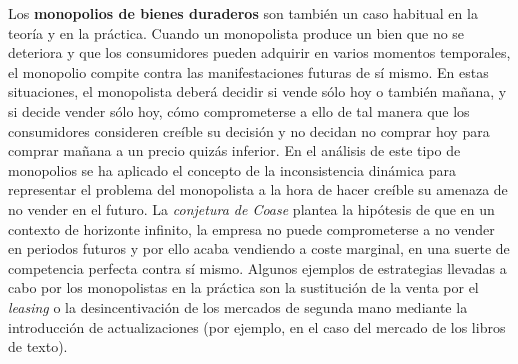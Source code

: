 \documentclass{nuevotema}
\begin{document}
Los \textbf{monopolios de bienes duraderos} son también un caso habitual en la teoría y en la práctica. Cuando un monopolista produce un bien que no se deteriora y que los consumidores pueden adquirir en varios momentos temporales, el monopolio compite contra las manifestaciones futuras de sí mismo. En estas situaciones, el monopolista deberá decidir si vende sólo hoy o también mañana, y si decide vender sólo hoy, cómo comprometerse a ello de tal manera que los consumidores consideren creíble su decisión y no decidan no comprar hoy para comprar mañana a un precio quizás inferior. En el análisis de este tipo de monopolios se ha aplicado el concepto de la inconsistencia dinámica para representar el problema del monopolista a la hora de hacer creíble su amenaza de no vender en el futuro. La \textit{conjetura de Coase} plantea la hipótesis de que en un contexto de horizonte infinito, la empresa no puede comprometerse a no vender en periodos futuros y por ello acaba vendiendo a coste marginal, en una suerte de competencia perfecta contra sí mismo. Algunos ejemplos de estrategias llevadas a cabo por los monopolistas en la práctica son la sustitución de la venta por el \textit{leasing} o la desincentivación de los mercados de segunda mano mediante la introducción de actualizaciones (por ejemplo, en el caso del mercado de los libros de texto).
\end{document}
